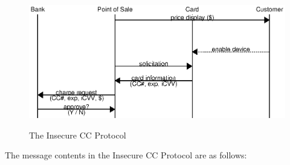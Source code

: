 \begin{figure}
  \caption{The Insecure CC Protocol}
  \centering
    \includegraphics{img/insecure_ccp.eps}
  \label{fig:insecure-ccp}
\end{figure}

The message contents in the Insecure CC Protocol are as follows:

